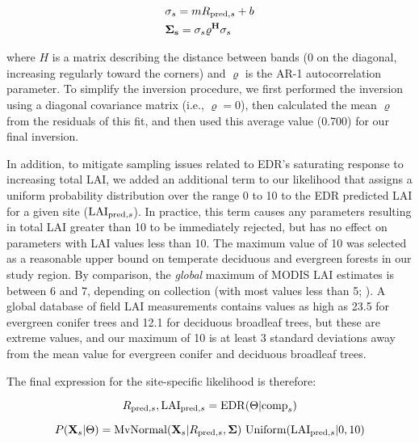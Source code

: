 \begin{align}
  & \relax{\sigma_{s}} = m R_{\mathrm{pred}, s} + b \\
  & \mathbf{\Sigma_{s}} = \relax{\sigma_{s}} \varrho^{\mathbf{H}} \relax{\sigma_{s}}
\end{align}

where $H$ is a matrix describing the distance between bands (0 on the diagonal, increasing regularly toward the corners) and $\varrho$ is the AR-1 autocorrelation parameter.
To simplify the inversion procedure, we first performed the inversion using a diagonal covariance matrix (i.e., $\varrho = 0$), then calculated the mean $\varrho$ from the residuals of this fit, and then used this average value (0.700) for our final inversion.

In addition, to mitigate sampling issues related to EDR's saturating response to increasing total LAI, we added an additional term to our likelihood that assigns a uniform probability distribution over the range 0 to 10 to the EDR predicted LAI for a given site ($\mathrm{LAI}_{\mathrm{pred}, s}$).
In practice, this term causes any parameters resulting in total LAI greater than 10 to be immediately rejected, but has no effect on parameters with LAI values less than 10.
The maximum value of 10 was selected as a reasonable upper bound on temperate deciduous and evergreen forests in our study region.
By comparison, the \emph{global} maximum of MODIS LAI estimates is between 6 and 7, depending on collection (with most values less than 5; \citealt{fang2012validation, yan2016evaluation}).
A global database of field LAI measurements \citep{iio2014global} contains values as high as 23.5 for evergreen conifer trees and 12.1 for deciduous broadleaf trees, but these are extreme values, and our maximum of 10 is at least 3 standard deviations away from the mean value for evergreen conifer and deciduous broadleaf trees.

The final expression for the site-specific likelihood is therefore:

\begin{equation}
  R_{\mathrm{pred}, s}, \mathrm{LAI}_{\mathrm{pred}, s} = \mathrm{EDR}(\relax{\Theta} | \mathrm{comp}_{s})
\end{equation}

\begin{equation}
  P(\mathbf{X}_{s} | \relax{\Theta}) =
  \mathrm{MvNormal}(\mathbf{X}_{s} | R_{\mathrm{pred}, s}, \mathbf{\Sigma}) ~
  \mathrm{Uniform}(\mathrm{LAI}_{\mathrm{pred}, s} | 0, 10)
\end{equation}

